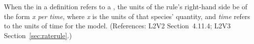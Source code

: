 When the  in a \RateRule definition refers to a \Species,
the units of the rule's right-hand side  be of the form \emph{x per
time}, where \emph{x} is the units of that species' quantity, and
\emph{time} refers to the units of time for the model.  (References: L2V2
Section~4.11.4; L2V3 Section~\ref{sec:raterule}.)

